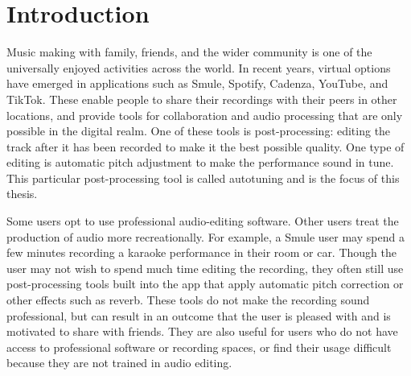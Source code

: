 \chapter{Introduction}
\label{chap:thesis-intro}
Music making with family, friends, and the wider community is one of the universally enjoyed activities across the world. In recent years, virtual options have emerged in applications such as Smule, Spotify, Cadenza, YouTube, and TikTok. These enable people to share their recordings with their peers in other locations, and provide tools for collaboration and audio processing that are only possible in the digital realm. One of these tools is post-processing: editing the track after it has been recorded to make it the best possible quality. One type of editing is automatic pitch adjustment to make the performance sound in tune. This particular post-processing tool is called autotuning and is the focus of this thesis. 

Some users opt to use professional audio-editing software. Other users treat the production of audio more recreationally. For example, a Smule user may spend a few minutes recording a karaoke performance in their room or car. Though the user may not wish to spend much time editing the recording, they often still use post-processing tools built into the app that apply automatic pitch correction or other effects such as reverb. These tools do not make the recording sound professional, but can result in an outcome that the user is pleased with and is motivated to share with friends. They are also useful for users who do not have access to professional software or recording spaces, or find their usage difficult because they are not trained in audio editing. 

